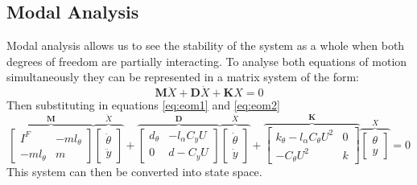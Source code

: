 \documentclass[11pt]{article}
\begin{document}
\subsection*{Modal Analysis}\label{sec:modal_analysis}
Modal analysis allows us to see the stability of the system as a whole when both degrees of freedom are partially interacting.
To analyse both equations of motion simultaneously they can be represented in a matrix system of the form:
$$
  \mathbf{M}\ddot{X}+\mathbf{D}\dot{X}+\mathbf{K}X = 0
$$
Then substituting in equations \ref{eq:eom1} and \ref{eq:eom2}
$$
  \overbrace{
    \begin{bmatrix}
      I^F&-ml_{\theta} \\
      -ml_{\theta}&m
    \end{bmatrix}
  }^{\mathbf{M}}
  \overbrace{
    \begin{bmatrix}
      \ddot{\theta} \\
      \ddot{y}
    \end{bmatrix}
  }^{\ddot{X}}
  +
  \overbrace{
    \begin{bmatrix}
      d_{\theta}&-l_{\alpha}C_yU\\
      0&d-C_yU
    \end{bmatrix}
  }^{\mathbf{D}}
  \overbrace{
    \begin{bmatrix}
      \dot{\theta} \\
      \dot{y}
    \end{bmatrix}
  }^{\dot{X}}
  +
  \overbrace{
    \begin{bmatrix}
      k_{\theta}-l_{\alpha}C_{\theta}U^2&0\\
    -C_{\theta}U^2&k
    \end{bmatrix}
  }^{\mathbf{K}}
  \overbrace{
    \begin{bmatrix}
      \theta \\
      y
    \end{bmatrix}
  }^X
  = 0
$$
This system can then be converted into state space.
\end{document}
